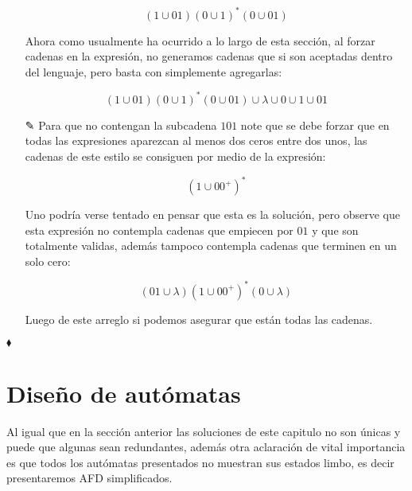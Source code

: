 \begin{itemize}
      $$(1\cup01)(0\cup1)^*(0\cup01)$$

      Ahora como usualmente ha ocurrido a lo largo de esta sección, al forzar cadenas en la expresión, no generamos cadenas que si son aceptadas dentro del lenguaje, pero basta con simplemente agregarlas:

      $$(1\cup01)(0\cup1)^*(0\cup01)\cup\lambda\cup0\cup1\cup01$$

      \item[✎]Para que no contengan la subcadena $101$ note que se debe forzar que en todas las expresiones aparezcan al menos dos ceros entre dos unos, las cadenas de este estilo se consiguen por medio de la expresión:

      $$(1\cup00^+)^*$$

      Uno podría verse tentado en pensar que esta es la solución, pero observe que esta expresión no contempla cadenas que empiecen por $01$ y que son totalmente validas, además tampoco contempla cadenas que terminen en un solo cero:

      $$(01\cup\lambda)(1\cup00^+)^*(0\cup\lambda)$$

      Luego de este arreglo si podemos asegurar que están todas las cadenas.
  
\end{itemize}

\hfill $\blacklozenge$

\section{Diseño de autómatas}


Al igual que en la sección anterior las soluciones de este capitulo no son únicas y puede que algunas sean redundantes, además otra aclaración de vital importancia es que todos los autómatas presentados no muestran sus estados limbo, es decir presentaremos AFD simplificados.\\

